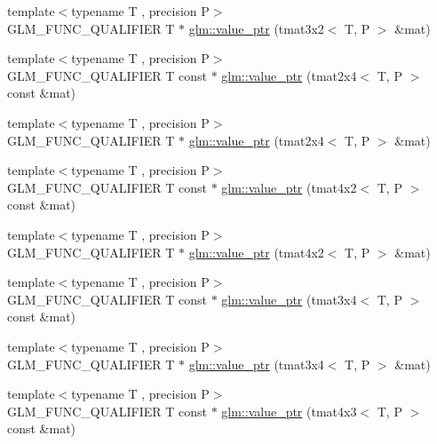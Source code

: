 \begin{DoxyCompactItemize}
\item 
{\footnotesize template$<$typename T , precision P$>$ }\\G\+L\+M\+\_\+\+F\+U\+N\+C\+\_\+\+Q\+U\+A\+L\+I\+F\+I\+E\+R T $\ast$ \hyperlink{group__gtc__type__ptr_gad6a737f57febdef255873f6a44d0db0e}{glm\+::value\+\_\+ptr} (tmat3x2$<$ T, P $>$ \&mat)
\item 
{\footnotesize template$<$typename T , precision P$>$ }\\G\+L\+M\+\_\+\+F\+U\+N\+C\+\_\+\+Q\+U\+A\+L\+I\+F\+I\+E\+R T const $\ast$ \hyperlink{group__gtc__type__ptr_ga2336cd68e72b0d295c8cd33eb1588480}{glm\+::value\+\_\+ptr} (tmat2x4$<$ T, P $>$ const \&mat)
\item 
{\footnotesize template$<$typename T , precision P$>$ }\\G\+L\+M\+\_\+\+F\+U\+N\+C\+\_\+\+Q\+U\+A\+L\+I\+F\+I\+E\+R T $\ast$ \hyperlink{group__gtc__type__ptr_ga0d745a55255710933effd6391307f681}{glm\+::value\+\_\+ptr} (tmat2x4$<$ T, P $>$ \&mat)
\item 
{\footnotesize template$<$typename T , precision P$>$ }\\G\+L\+M\+\_\+\+F\+U\+N\+C\+\_\+\+Q\+U\+A\+L\+I\+F\+I\+E\+R T const $\ast$ \hyperlink{group__gtc__type__ptr_ga1de002422f32c6da9d65d3f257f37196}{glm\+::value\+\_\+ptr} (tmat4x2$<$ T, P $>$ const \&mat)
\item 
{\footnotesize template$<$typename T , precision P$>$ }\\G\+L\+M\+\_\+\+F\+U\+N\+C\+\_\+\+Q\+U\+A\+L\+I\+F\+I\+E\+R T $\ast$ \hyperlink{group__gtc__type__ptr_ga0e62660f9066864568cd74d76d528a6e}{glm\+::value\+\_\+ptr} (tmat4x2$<$ T, P $>$ \&mat)
\item 
{\footnotesize template$<$typename T , precision P$>$ }\\G\+L\+M\+\_\+\+F\+U\+N\+C\+\_\+\+Q\+U\+A\+L\+I\+F\+I\+E\+R T const $\ast$ \hyperlink{group__gtc__type__ptr_gacbf08ea2313cad8a42652d4455e69709}{glm\+::value\+\_\+ptr} (tmat3x4$<$ T, P $>$ const \&mat)
\item 
{\footnotesize template$<$typename T , precision P$>$ }\\G\+L\+M\+\_\+\+F\+U\+N\+C\+\_\+\+Q\+U\+A\+L\+I\+F\+I\+E\+R T $\ast$ \hyperlink{group__gtc__type__ptr_gafac7c10d557c3db2f061af0ffe8fc9cf}{glm\+::value\+\_\+ptr} (tmat3x4$<$ T, P $>$ \&mat)
\item 
{\footnotesize template$<$typename T , precision P$>$ }\\G\+L\+M\+\_\+\+F\+U\+N\+C\+\_\+\+Q\+U\+A\+L\+I\+F\+I\+E\+R T const $\ast$ \hyperlink{group__gtc__type__ptr_ga72b0a496d6c190645accac32f48f64bb}{glm\+::value\+\_\+ptr} (tmat4x3$<$ T, P $>$ const \&mat)

\end{DoxyCompactItemize}
